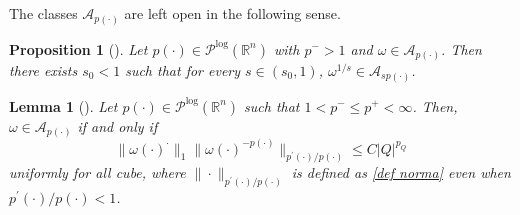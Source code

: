 \documentclass[a4paper,11pt,reqno]{amsart}
\theoremstyle{plain}
\numberwithin{equation}{section}
\newtheorem{lema}[teo]{Lemma}
\newtheorem{propo}[teo]{Proposition}
\theoremstyle{definition}
\newcommand{\R}{{\mathbb{R}^n}}
\begin{document}
The classes $\mathcal{A}_{p(\cdot)}$ are left open in the following sense.
\begin{propo}[\cite{C-U Diening Hasto}]\label{Ap abierto izq}
	Let $p(\cdot)\in\mathcal{P}^{\text{log}}(\R)$ with $p^->1$ and $\omega\in\mathcal{A}_{p(\cdot)}$. Then there exists $s_0<1$ such that for every $s\in (s_0,1)$, $\omega^{1/s}\in\mathcal{A}_{sp(\cdot)}$.
\end{propo}
\begin{lema}[\cite{C-U Diening Hasto}]\label{def equiv de Ap}
	Let $p(\cdot)\in\mathcal{P}^{\text{log}}(\R)$ such that $1<p^-\leq p^+<\infty$. Then, $\omega\in\mathcal{A}_{p(\cdot)}$ if and only if
	$$\|\omega(\cdot)^{\cdot}\|_1\|\omega(\cdot)^{-p(\cdot)}\|_{p^\prime(\cdot)/p(\cdot)}\leq C|Q|^{p_Q}$$
	uniformly for all cube, where $\|\cdot\|_{p^\prime(\cdot)/p(\cdot)}$ is defined as \eqref{def norma} even when $p^\prime(\cdot)/p(\cdot)<1$.
	 
\end{lema}
\end{document}
